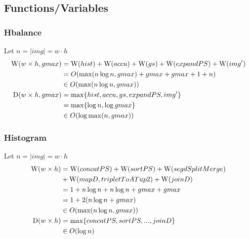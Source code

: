     \subsection*{Functions/Variables}

    \subsubsection*{Hbalance}
      Let $n = |img| = w\cdot h$
      \begin{equation}
      \begin{split}
      \textrm{W}(w \times h,gmax)
            & = \textrm{W}(hist) + \textrm{W}(accu) + \textrm{W}(gs) + \textrm{W}(expandPS) + \textrm{W}(img') \\
            & = O( \max(n \log n, gmax) + gmax + gmax + 1 + n) \\
            & \in O(\max(n \log n, gmax)) \\
      \textrm{D}(w \times h,gmax)
          & = \max \{ hist, accu, gs, expandPS, img'\} \\
          & = \max \{\log n, \log gmax \} \\
          & \in O(\log \max(n,gmax)) \\
      \end{split}
      \end{equation}
        
    \subsubsection*{Histogram}
      Let $n = |img| = w\cdot h$
      \begin{equation}
      \begin{split}
      \textrm{W}(w \times h)
            & = \textrm{W}(concatPS) + \textrm{W}(sortPS) + \textrm{W}(segdSplitMerge) \\
            & + \textrm{W}(mapD,tripletToATup2) + \textrm{W}(joinD) \\
            & = 1 + n \log n + n \log n + gmax + gmax \\
            & = 1 + 2 (n \log n + gmax) \\
            & \in O(\max(n \log n, gmax)) \\
      \textrm{D}(w \times h)
            & = \max \{ concatPS,sortPS,...,joinD\} \\
            & \in O(\log n) \\
      \end{split}
      \end{equation}
    
